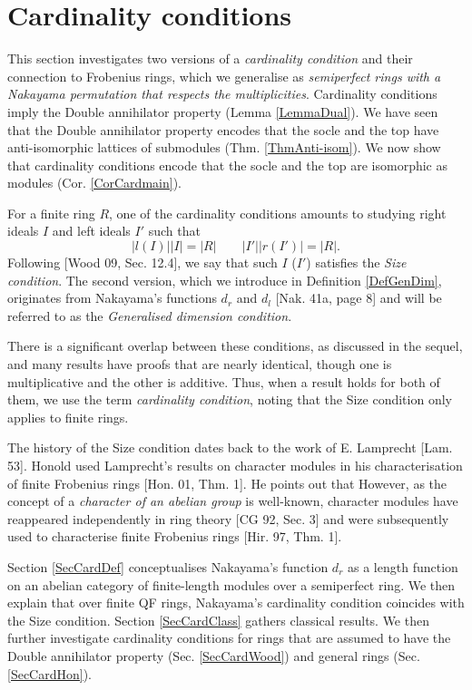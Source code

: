 \documentclass[11pt]{article}
\theoremstyle{plain}
\theoremstyle{remark}
\theoremstyle{plain}
\begin{document}
\section{Cardinality conditions}\label{SecCard}

This section investigates two versions of a \textit{cardinality condition} and their connection to Frobenius rings, which we generalise as \textit{semiperfect rings with a Nakayama permutation that respects the multiplicities}. Cardinality conditions imply the Double annihilator property (Lemma \ref{LemmaDual}). We have seen that the Double annihilator property encodes that the socle and the top have anti-isomorphic lattices of submodules (Thm. \ref{ThmAnti-isom}). We now show that cardinality conditions encode that the socle and the top are isomorphic as modules (Cor. \ref{CorCardmain}).



For a finite ring $R$, one of the cardinality conditions amounts to studying right ideals $I$ and left ideals $I'$ such that \[|l(I)||I|=|R|\qquad |I'||r(I')|=|R|.\] Following  [Wood 09, Sec. 12.4], we say that such $I$ ($I'$) satisfies the \textit{Size condition}. The second version, which we introduce in Definition \ref{DefGenDim}, originates from Nakayama's functions $d_r$ and $d_l$ [Nak. 41a, page 8] and will be referred to as the \textit{Generalised dimension condition}. 

There is a significant overlap between these conditions, as discussed in the sequel, and many results have proofs that are nearly identical, though one is multiplicative and the other is additive. Thus, when a result holds for both of them, we use the term \textit{cardinality condition}, noting that the Size condition only applies to finite rings.

The history of the Size condition dates back to the work of E. Lamprecht [Lam. 53]. Honold used Lamprecht's results on character modules in his characterisation of finite Frobenius rings [Hon. 01, Thm. 1]. He points out that  However, as the concept of a \textit{character of an abelian group} is well-known, character modules have reappeared independently in ring theory [CG 92, Sec. 3] and were subsequently used to characterise finite Frobenius rings [Hir. 97, Thm. 1].


\smallskip 


Section \ref{SecCardDef} conceptualises Nakayama's function $d_r$ as a length function on an abelian category of finite-length modules over a semiperfect ring. We then explain that over finite QF rings, Nakayama's cardinality condition coincides with the Size condition. Section \ref{SecCardClass}  gathers classical results.  We then further investigate cardinality conditions for rings that are assumed to have the Double annihilator property (Sec. \ref{SecCardWood}) and general rings (Sec. \ref{SecCardHon}).
\end{document}
